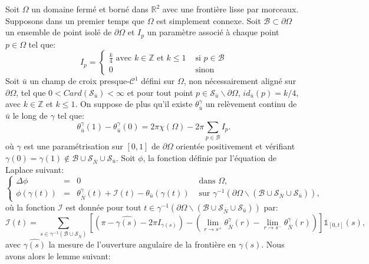 Soit $\Omega$ un domaine fermé et borné dans $\mathbb{R}^2$ avec une frontière lisse par morceaux. Supposons dans un premier temps que $\Omega$ est simplement connexe. Soit $\mathcal{B}\subset\partial\Omega$ un ensemble de point isolé de $\partial\Omega$ et $I_p$ un paramètre associé à chaque point $p\in\Omega$ tel que:
\begin{equation}
I_p=
\left\{
\begin{array}{ll}
\displaystyle\frac{k}{4}\mbox{ avec }k\in\mathbb{Z}\mbox{ et }k\leq 1& \mbox{ si } p\in\mathcal{B}\\[0.5cm]
0& \mbox{ sinon }
\end{array}
\right.
\end{equation}
Soit $\bar{u}$ un champ de croix presque-$\mathcal{C}^1$ défini sur $\Omega$, non nécessairement aligné sur $\partial\Omega$, tel que $0<Card(\mathcal{S}_{\bar{u}})<\infty$ et pour tout point $p\in\mathcal{S}_{\bar{u}}\backslash\partial\Omega$, $id_{\bar{u}}(p)=k/4$, avec $k\in\mathbb{Z}$ et $k\leq 1$. On suppose de plus qu'il existe $\theta_{\bar{u}}^\gamma$ un relèvement continu de $\bar{u}$ le long de $\gamma$ tel que:
\begin{equation}
    \theta_{\bar{u}}^\gamma(1)-\theta_{\bar{u}}^\gamma(0)=2\pi\chi(\Omega)-2\pi\sum_{p\in\mathcal{B}}I_p.
\end{equation}
où $\gamma$ est une paramétrisation sur $[0, 1]$ de $\partial\Omega$ orientée positivement et vérifiant $\gamma(0)=\gamma(1)\notin\mathcal{B}\cup\mathcal{S}_{\bar{N}}\cup\mathcal{S}_{\bar{u}}$.
Soit $\phi$, la fonction définie par l'équation de Laplace suivant:
\begin{equation}
\left\{
\begin{array}{lcll}
\Delta\phi &=& 0 &\mbox{ dans }\Omega,\\[0.5cm]
\phi(\gamma(t))&=&\theta_{\bar{N}}^\gamma(t)+\mathcal{I}(t)-\theta_{\bar{u}}(\gamma(t))& \mbox{ sur } \gamma^{-1}(\partial\Omega\backslash(\mathcal{B}\cup\mathcal{S}_{\bar{N}}\cup\mathcal{S}_{\bar{u}})),
\end{array}
\right.
\end{equation}
où la fonction $\mathcal{I}$ est donnée pour tout $t\in\gamma^{-1}(\partial\Omega\backslash(\mathcal{B}\cup\mathcal{S}_{\bar{N}}\cup\mathcal{S}_{\bar{u}}))$ par:
$$
\mathcal{I}(t)=\sum_{s\in\gamma^{-1}(\mathcal{B}\cup\mathcal{S}_{\bar{N}})}\left[\left(\pi-\widehat{\gamma(s)}-2\pi I_{\gamma(s)}\right)-\left(\lim\limits_{r\rightarrow s^+}\theta^{\gamma}_{\bar{N}}(r) - \lim\limits_{r\rightarrow s^-}\theta^{\gamma}_{\bar{N}}(r)\right)\right]\mathbb{1}_{[0, t]}(s),
$$
avec $\widehat{\gamma(s)}$ la mesure de l'ouverture angulaire de la frontière en $\gamma(s)$. Nous avons alors le lemme suivant:

